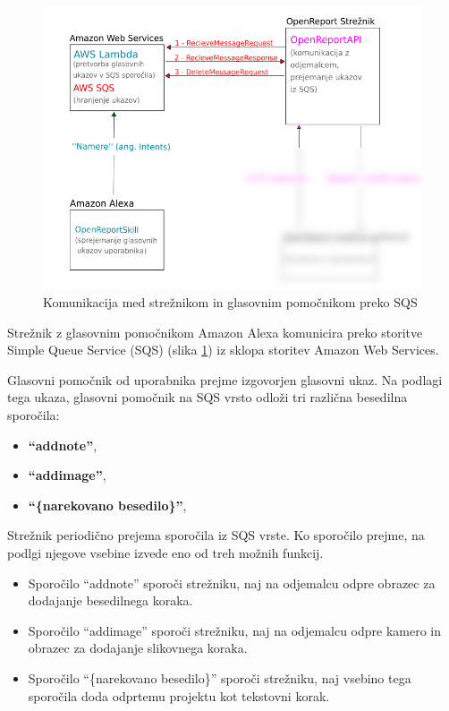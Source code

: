 \documentclass[a4paper, 12pt]{book}
\begin{document}
\begin{figure}[H]
\begin{center}
\includegraphics[width=13cm]{plan_sqs_server_alexa}
\end{center}
\caption{Komunikacija med strežnikom in glasovnim pomočnikom preko SQS}
\label{plan_sqs_server_alexa}
\end{figure}

Strežnik z glasovnim pomočnikom Amazon Alexa komunicira preko storitve Simple Queue Service (SQS) (slika \ref{plan_sqs_server_alexa}) iz sklopa storitev Amazon Web Services.

Glasovni pomočnik od uporabnika prejme izgovorjen glasovni ukaz.
Na podlagi tega ukaza, glasovni pomočnik na SQS vrsto odloži tri različna besedilna sporočila:
\begin{itemize}
	\item \textbf{\enquote{addnote}},
	\item \textbf{\enquote{addimage}},
	\item \textbf{\enquote{\{narekovano besedilo\}}},
\end{itemize}

Strežnik periodično prejema sporočila iz SQS vrste.
Ko sporočilo prejme, na podlgi njegove vsebine izvede eno od treh možnih funkcij.

\begin{itemize}
	\item Sporočilo \enquote{addnote} sporoči strežniku, naj na odjemalcu odpre obrazec za dodajanje besedilnega koraka.
	\item Sporočilo \enquote{addimage} sporoči strežniku, naj na odjemalcu odpre kamero in obrazec za dodajanje slikovnega koraka.
	\item Sporočilo \enquote{\{narekovano besedilo\}} sporoči strežniku, naj vsebino tega sporočila doda odprtemu projektu kot tekstovni korak.
\end{itemize}
\end{document}
